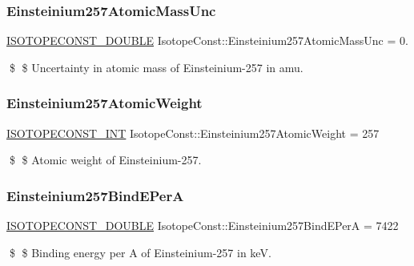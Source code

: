 \subsubsection{\texorpdfstring{Einsteinium257\+Atomic\+Mass\+Unc}{Einsteinium257AtomicMassUnc}}
{\footnotesize\ttfamily \mbox{\hyperlink{group___isotope_const-_macros_ga8f45a7272ce02c0b4c65c44636ed719a}{I\+S\+O\+T\+O\+P\+E\+C\+O\+N\+S\+T\+\_\+\+D\+O\+U\+B\+LE}} Isotope\+Const\+::\+Einsteinium257\+Atomic\+Mass\+Unc = 0.}

\$ \$ Uncertainty in atomic mass of Einsteinium-\/257 in amu. \mbox{\label{group___isotope_const-_einsteinium-_es257_gae3c247a068cc34afc9750f40aa5d1e61}} 
\subsubsection{\texorpdfstring{Einsteinium257\+Atomic\+Weight}{Einsteinium257AtomicWeight}}
{\footnotesize\ttfamily \mbox{\hyperlink{group___isotope_const-_macros_ga5f18360b3e99483a35c32d789e62621c}{I\+S\+O\+T\+O\+P\+E\+C\+O\+N\+S\+T\+\_\+\+I\+NT}} Isotope\+Const\+::\+Einsteinium257\+Atomic\+Weight = 257}

\$ \$ Atomic weight of Einsteinium-\/257. \mbox{\label{group___isotope_const-_einsteinium-_es257_ga61367dad7a146d0208823b27f87bc5ad}} 
\subsubsection{\texorpdfstring{Einsteinium257\+Bind\+E\+PerA}{Einsteinium257BindEPerA}}
{\footnotesize\ttfamily \mbox{\hyperlink{group___isotope_const-_macros_ga8f45a7272ce02c0b4c65c44636ed719a}{I\+S\+O\+T\+O\+P\+E\+C\+O\+N\+S\+T\+\_\+\+D\+O\+U\+B\+LE}} Isotope\+Const\+::\+Einsteinium257\+Bind\+E\+PerA = 7422}

\$ \$ Binding energy per A of Einsteinium-\/257 in keV. \mbox{\label{group___isotope_const-_einsteinium-_es257_gadb5090277fc45852ca2118ea42b5f502}} 
